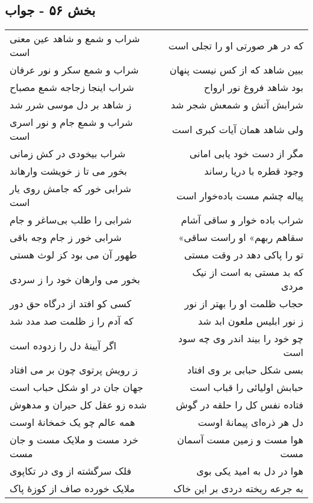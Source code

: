 \begin{center}
\section*{بخش ۵۶ - جواب}
\label{sec:sh056}
\begin{longtable}{l p{0.5cm} r}
شراب و شمع و شاهد عین معنی است
&&
که در هر صورتی او را تجلی است
\\
شراب و شمع سکر و نور عرفان
&&
ببین شاهد که از کس نیست پنهان
\\
شراب اینجا زجاجه شمع مصباح
&&
بود شاهد فروغ نور ارواح
\\
ز شاهد بر دل موسی شرر شد
&&
شرابش آتش و شمعش شجر شد
\\
شراب و شمع جام و نور اسری است
&&
ولی شاهد همان آیات کبری است
\\
شراب بیخودی در کش زمانی
&&
مگر از دست خود یابی امانی
\\
بخور می تا ز خویشت وارهاند
&&
وجود قطره با دریا رساند
\\
شرابی خور که جامش روی یار است
&&
پیاله چشم مست باده‌خوار است
\\
شرابی را طلب بی‌ساغر و جام
&&
شراب باده خوار و ساقی آشام
\\
شرابی خور ز جام وجه باقی
&&
«سقاهم ربهم» او راست ساقی
\\
طهور آن می بود کز لوث هستی
&&
تو را پاکی دهد در وقت مستی
\\
بخور می وارهان خود را ز سردی
&&
که بد مستی به است از نیک مردی
\\
کسی کو افتد از درگاه حق دور
&&
حجاب ظلمت او را بهتر از نور
\\
که آدم را ز ظلمت صد مدد شد
&&
ز نور ابلیس ملعون ابد شد
\\
اگر آیینهٔ دل را زدوده است
&&
چو خود را بیند اندر وی چه سود است
\\
ز رویش پرتوی چون بر می افتاد
&&
بسی شکل حبابی بر وی افتاد
\\
جهان جان در او شکل حباب است
&&
حبابش اولیائی را قباب است
\\
شده زو عقل کل حیران و مدهوش
&&
فتاده نفس کل را حلقه در گوش
\\
همه عالم چو یک خمخانهٔ اوست
&&
دل هر ذره‌ای پیمانهٔ اوست
\\
خرد مست و ملایک مست و جان مست
&&
هوا مست و زمین مست آسمان مست
\\
فلک سرگشته از وی در تکاپوی
&&
هوا در دل به امید یکی بوی
\\
ملایک خورده صاف از کوزهٔ پاک
&&
به جرعه ریخته دردی بر این خاک
\\

\end{longtable}
\end{center}
